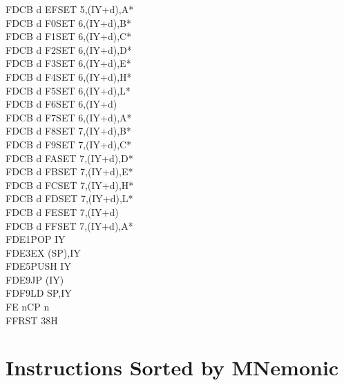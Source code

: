 \documentclass[oneside,a4paper]{book}
\begin{document}
\begin{multicols}{3}
{\begin{tabbing}
FDCB d EF\>SET 5,(IY+d),A*\\
FDCB d F0\>SET 6,(IY+d),B*\\
FDCB d F1\>SET 6,(IY+d),C*\\
FDCB d F2\>SET 6,(IY+d),D*\\
FDCB d F3\>SET 6,(IY+d),E*\\
FDCB d F4\>SET 6,(IY+d),H*\\
FDCB d F5\>SET 6,(IY+d),L*\\
FDCB d F6\>SET 6,(IY+d)\\
FDCB d F7\>SET 6,(IY+d),A*\\
FDCB d F8\>SET 7,(IY+d),B*\\
FDCB d F9\>SET 7,(IY+d),C*\\
FDCB d FA\>SET 7,(IY+d),D*\\
FDCB d FB\>SET 7,(IY+d),E*\\
FDCB d FC\>SET 7,(IY+d),H*\\
FDCB d FD\>SET 7,(IY+d),L*\\
FDCB d FE\>SET 7,(IY+d)\\
FDCB d FF\>SET 7,(IY+d),A*\\
FDE1\>POP IY\\
FDE3\>EX (SP),IY\\
FDE5\>PUSH IY\\
FDE9\>JP (IY)\\
FDF9\>LD SP,IY\\
FE n\>CP n\\
FF\>RST 38H
\end{tabbing}
}
\end{multicols}
\normalsize

\chapter{Instructions Sorted by MNemonic}
\end{document}
